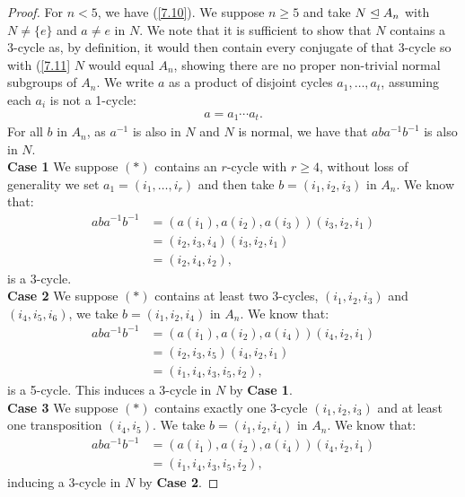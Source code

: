 \begin{proof}
    For $n < 5$, we have (\ref{7.10}). We suppose $n \geq 5$
    and take $N \trianglelefteq A_n$ with $N \neq \{e\}$ and $a \neq e$ in $N$.
    We note that it is sufficient to show that $N$ contains a
    3-cycle as, by definition, it would then contain every conjugate 
    of that 3-cycle so with (\ref{7.11} $N$ would equal $A_n$, 
    showing there are no proper non-trivial normal subgroups of 
    $A_n$. We write $a$ as a product of disjoint cycles $a_1, \ldots, a_t$,
    assuming each $a_i$ is not a 1-cycle: \begin{align*}
        a = a_1 \cdots a_t. \tag{$\ast$}
    \end{align*} For all $b$ in $A_n$, as $a^{-1}$ is also in
    $N$ and $N$ is normal, we have that $aba^{-1}b^{-1}$ is also in $N$.
    \\[\baselineskip]
    \textbf{Case 1} We suppose $(\ast)$ contains an $r$-cycle
    with $r \geq 4$, without loss of generality we set
    $a_1 = (i_1, \ldots, i_r)$ and then take $b = (i_1, i_2, i_3)$
    in $A_n$. We know that: \begin{align*}
        aba^{-1}b^{-1} 
        &= (a(i_1), a(i_2), a(i_3))(i_3, i_2, i_1) \\
        &= (i_2, i_3, i_4)(i_3, i_2, i_1) \\
        &= (i_2, i_4, i_2),
    \end{align*} is a 3-cycle.
    \\[\baselineskip]
    \textbf{Case 2}
    We suppose $(\ast)$ contains at least two 3-cycles,
    $(i_1, i_2, i_3)$ and $(i_4, i_5, i_6)$, we take
    $b = (i_1, i_2, i_4)$ in $A_n$. We know that: \begin{align*}
        aba^{-1}b^{-1}
        &= (a(i_1), a(i_2), a(i_4))(i_4, i_2, i_1) \\
        &= (i_2, i_3, i_5)(i_4, i_2, i_1) \\
        &= (i_1, i_4, i_3, i_5, i_2),
    \end{align*} is a 5-cycle. This induces a 3-cycle in $N$ by
    \textbf{Case 1}.
    \\[\baselineskip]
    \textbf{Case 3}
    We suppose $(\ast)$ contains exactly one 3-cycle $(i_1, i_2, i_3)$
    and at least one transposition $(i_4, i_5)$. We take 
    $b = (i_1, i_2, i_4)$ in $A_n$. We know that: \begin{align*}
        aba^{-1}b^{-1}
        &= (a(i_1), a(i_2), a(i_4))(i_4, i_2, i_1) \\
        &= (i_1, i_4, i_3, i_5, i_2),
    \end{align*} inducing a 3-cycle in $N$ by \textbf{Case 2}.

\end{proof}
